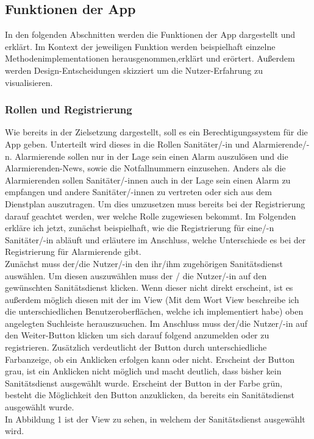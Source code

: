 \subsection{Funktionen der App}
        In den folgenden Abschnitten werden die Funktionen der App dargestellt 
        und erklärt. Im Kontext der jeweiligen Funktion werden beispielhaft einzelne 
        Methodenimplementationen herausgenommen,erklärt  und erörtert.
        Außerdem werden Design-Entscheidungen skizziert um die Nutzer-Erfahrung zu 
        visualisieren.   
        
\subsubsection{Rollen und Registrierung}
        Wie bereits in der Zielsetzung dargestellt, soll es ein Berechtigungssystem 
        für die App geben. Unterteilt wird dieses in die Rollen \glqq Sanitäter/-in\grqq{} 
        und \glqq Alarmierende/-n\grqq{}. Alarmierende sollen nur in der Lage sein einen Alarm 
        auszulösen und die Alarmierenden-News, sowie die Notfallnummern einzusehen.
        Anders als die Alarmierenden sollen Sanitäter/-innen auch in der Lage sein 
        einen Alarm zu empfangen und andere Sanitäter/-innen zu vertreten oder sich 
        aus dem Dienstplan auszutragen. Um dies umzusetzen muss bereits bei der 
        Registrierung darauf geachtet werden, wer welche Rolle zugewiesen bekommt.
        Im Folgenden erkläre ich jetzt, zunächst beispielhaft, wie die Registrierung 
        für eine/-n Sanitäter/-in abläuft und erläutere im Anschluss, welche Unterschiede es 
        bei der Registrierung für Alarmierende gibt.
        \newline\\
        Zunächst muss der/die Nutzer/-in den ihr/ihm zugehörigen Sanitätsdienst 
        auswählen. Um diesen auszuwählen muss der / die Nutzer/-in auf 
        den gewünschten Sanitätsdienst klicken. Wenn dieser nicht direkt erscheint, 
        ist es außerdem möglich diesen mit der im View (Mit dem Wort View beschreibe ich die unterschiedlichen
        Benutzeroberflächen, welche ich implementiert habe) oben angelegten Suchleiste herauszusuchen.  
        Im Anschluss muss der/die Nutzer/-in auf den \glqq Weiter\grqq{}-Button klicken um sich
        darauf folgend anzumelden oder zu registrieren. 
        Zusätzlich verdeutlicht der Button durch unterschiedliche Farbanzeige, ob ein Anklicken erfolgen kann oder nicht.
        Erscheint der Button grau, ist ein Anklicken nicht möglich und macht deutlich, dass bisher kein Sanitätsdienst 
        ausgewählt wurde. Erscheint der Button in der Farbe grün, besteht die Möglichkeit den Button anzuklicken, da bereits
        ein Sanitätsdienst ausgewählt wurde.
        \\In Abbildung 1 ist der View zu sehen, 
        in welchem der Sanitätsdienst ausgewählt wird.
        
